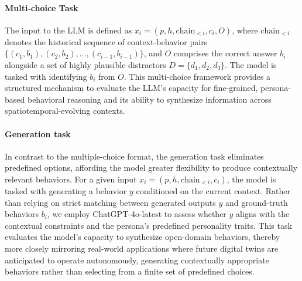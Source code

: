 \paragraph{Multi-choice Task}
The input to the LLM is defined as \( x_i = (p, h, \text{chain}_{<i}, c_i, O) \), where \( \text{chain}_{<i} \) denotes the historical sequence of context-behavior pairs \(\{(c_1, b_1), (c_2, b_2), \dots, (c_{i-1}, b_{i-1})\}\), and \( O \) comprises the correct answer \( b_i \) alongside a set of highly plausible distractors \( D = \{d_1, d_2, d_3\} \). The model is tasked with identifying \( b_i \) from \( O \). This multi-choice framework provides a structured mechanism to evaluate the LLM’s capacity for fine-grained, persona-based behavioral reasoning and its ability to synthesize information across spatiotemporal-evolving contexts.  


\paragraph{Generation task} 
In contrast to the multiple-choice format, the generation task eliminates predefined options, affording the model greater flexibility to produce contextually relevant behaviors. For a given input \( x_i = (p, h, \text{chain}_{<i}, c_i) \), the model is tasked with generating a behavior \( y \) conditioned on the current context. Rather than relying on strict matching between generated outputs \( y \) and ground-truth behaviors \( b_i \), we employ ChatGPT-4o-latest to assess whether \( y \) aligns with the contextual constraints and the persona's predefined personality traits. This task evaluates the model’s capacity to synthesize open-domain behaviors, thereby more closely mirroring real-world applications where future digital twins are anticipated to operate autonomously, generating contextually appropriate behaviors rather than selecting from a finite set of predefined choices.  




